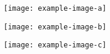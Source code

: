 \vspace{2em}

\begin{center} %
	\begin{minipage}[c]{.25\linewidth}
		\centering\texttt{[image: example-image-a]} 
	\end{minipage}\hfill
	\begin{minipage}[c]{.25\linewidth}
		\centering\texttt{[image: example-image-b]}
	\end{minipage}\hfill
	\begin{minipage}[c]{.25\linewidth}
		\centering\texttt{[image: example-image-c]} 
	\end{minipage}\hfill
\end{center}

\restoregeometry